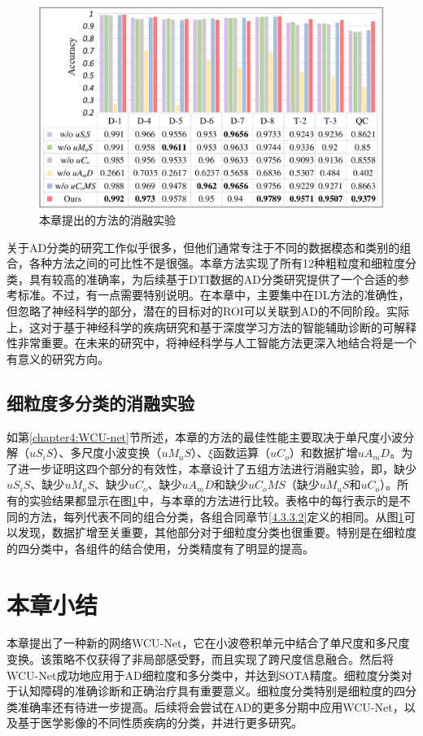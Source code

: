   \begin{figure}[ht]
      \centering
      \includegraphics[width=0.9\linewidth]{figs/paper3ablation4.pdf}
      \caption{本章提出的方法的消融实验}\label{paper3ablation}
    \end{figure}  
关于AD分类的研究工作似乎很多，但他们通常专注于不同的数据模态和类别的组合，各种方法之间的可比性不是很强。本章方法实现了所有12种粗粒度和细粒度分类，具有较高的准确率，为后续基于DTI数据的AD分类研究提供了一个合适的参考标准。不过，有一点需要特别说明。在本章中，主要集中在DL方法的准确性，但忽略了神经科学的部分，潜在的目标对的ROI可以关联到AD的不同阶段。实际上，这对于基于神经科学的疾病研究和基于深度学习方法的智能辅助诊断的可解释性非常重要。在未来的研究中，将神经科学与人工智能方法更深入地结合将是一个有意义的研究方向。

\subsection{细粒度多分类的消融实验}

如第\ref{chapter4:WCU-net}节所述，本章的方法的最佳性能主要取决于单尺度小波分解（$uS_{i}S$）、多尺度小波变换（$uM_{u}S$）、$\xi$函数运算（$uC_{o}$）和数据扩增$uA_{m}D$。为了进一步证明这四个部分的有效性，本章设计了五组方法进行消融实验，即，缺少$uS_{i}S$、缺少$uM_{u}S$、缺少$uC_{o}$、缺少$ uA_{m}D$和缺少$uC_{o}MS$（缺少$uM_{u}S$和$uC_{o}$）。所有的实验结果都显示在图\ref{paper3ablation}中，与本章的方法进行比较。表格中的每行表示的是不同的方法，每列代表不同的组合分类，各组合同章节\ref{4.3.3.2}定义的相同。从图\ref{paper3ablation}可以发现，数据扩增至关重要，其他部分对于细粒度分类也很重要。特别是在细粒度的四分类中，各组件的结合使用，分类精度有了明显的提高。



\section{本章小结}\label{chapter4.5}
本章提出了一种新的网络WCU-Net，它在小波卷积单元中结合了单尺度和多尺度变换。该策略不仅获得了非局部感受野，而且实现了跨尺度信息融合。然后将WCU-Net成功地应用于AD细粒度和多分类中，并达到SOTA精度。细粒度分类对于认知障碍的准确诊断和正确治疗具有重要意义。细粒度分类特别是细粒度的四分类准确率还有待进一步提高。后续将会尝试在AD的更多分期中应用WCU-Net，以及基于医学影像的不同性质疾病的分类，并进行更多研究。


